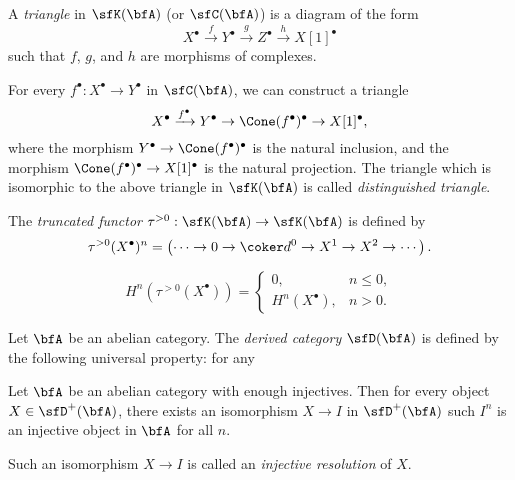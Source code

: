     \begin{definition}\label{def:triangle}
        A \emph{triangle} in \(\sfK(\bfA)\) (or \(\sfC(\bfA)\)) is a diagram of the form
        \[
            X^\bullet \xrightarrow{f} Y^\bullet \xrightarrow{g} Z^\bullet \xrightarrow{h} X[1]^\bullet
        \]
        such that \(f\), \(g\), and \(h\) are morphisms of complexes.
    \end{definition}

    For every \(f^\bullet: X^\bullet \to Y^\bullet\) in \(\sfC(\bfA)\), we can construct a triangle
    \[ X^\bullet \xrightarrow{f^\bullet} Y^\bullet \to \Cone(f^\bullet)^\bullet \to X[1]^\bullet, \]
    where the morphism \(Y^\bullet \to \Cone(f^\bullet)^\bullet\) is the natural inclusion, 
    and the morphism \(\Cone(f^\bullet)^\bullet \to X[1]^\bullet\) is the natural projection.
    The triangle which is isomorphic to the above triangle in \(\sfK(\bfA)\) is called \emph{distinguished triangle}.

    \begin{definition}\label{def:truncation_functor}
        The \emph{truncated functor} \(\tau^{>0}: \sfK(\bfA) \to \sfK(\bfA)\) is defined by
        \[ \tau^{>0}(X^\bullet)^n = \left( \cdots \to 0 \to \coker d^0 \to X^1 \to X^2 \to \cdots \right). \]
    \end{definition}
    \[ H^n(\tau^{>0}(X^\bullet)) = \begin{cases}
        0, & n \leq 0, \\
        H^n(X^\bullet), & n > 0.
    \end{cases} \]


    \begin{definition}\label{def:derived_category}
        Let \(\bfA\) be an abelian category. The \emph{derived category} \(\sfD(\bfA)\) is defined by the following universal property: 
        for any
    \end{definition}

    \begin{proposition}\label{prop:existence_of_injective_resolution}
        Let \(\bfA\) be an abelian category with enough injectives.
        Then for every object \(X \in \sfD^+(\bfA)\), there exists an isomorphism \(X \to I\) in \(\sfD^+(\bfA)\) such \(I^n\) is an injective object in \(\bfA\) for all \(n\).
    \end{proposition}

    \begin{definition}
        Such an isomorphism \(X \to I\) is called an \emph{injective resolution} of \(X\).
    \end{definition}

